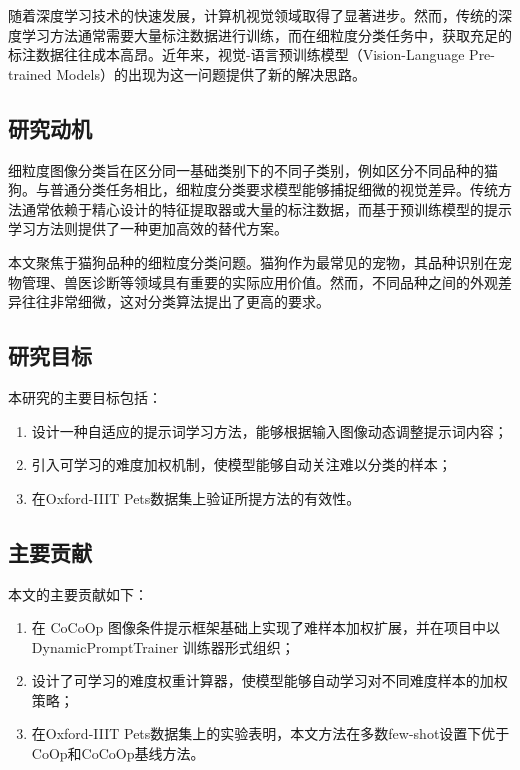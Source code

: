 随着深度学习技术的快速发展，计算机视觉领域取得了显著进步。然而，传统的深度学习方法通常需要大量标注数据进行训练，而在细粒度分类任务中，获取充足的标注数据往往成本高昂。近年来，视觉-语言预训练模型（Vision-Language Pre-trained Models）的出现为这一问题提供了新的解决思路。

\subsection{研究动机}

细粒度图像分类旨在区分同一基础类别下的不同子类别，例如区分不同品种的猫狗。与普通分类任务相比，细粒度分类要求模型能够捕捉细微的视觉差异。传统方法通常依赖于精心设计的特征提取器或大量的标注数据，而基于预训练模型的提示学习方法则提供了一种更加高效的替代方案。

本文聚焦于猫狗品种的细粒度分类问题。猫狗作为最常见的宠物，其品种识别在宠物管理、兽医诊断等领域具有重要的实际应用价值。然而，不同品种之间的外观差异往往非常细微，这对分类算法提出了更高的要求。

\subsection{研究目标}

本研究的主要目标包括：

\begin{enumerate}
\item 设计一种自适应的提示词学习方法，能够根据输入图像动态调整提示词内容；
\item 引入可学习的难度加权机制，使模型能够自动关注难以分类的样本；
\item 在Oxford-IIIT Pets数据集上验证所提方法的有效性。
\end{enumerate}

\subsection{主要贡献}

本文的主要贡献如下：

\begin{enumerate}
\item 在 CoCoOp 图像条件提示框架基础上实现了难样本加权扩展，并在项目中以 DynamicPromptTrainer 训练器形式组织；
\item 设计了可学习的难度权重计算器，使模型能够自动学习对不同难度样本的加权策略；
\item 在Oxford-IIIT Pets数据集上的实验表明，本文方法在多数few-shot设置下优于CoOp和CoCoOp基线方法。
\end{enumerate}
